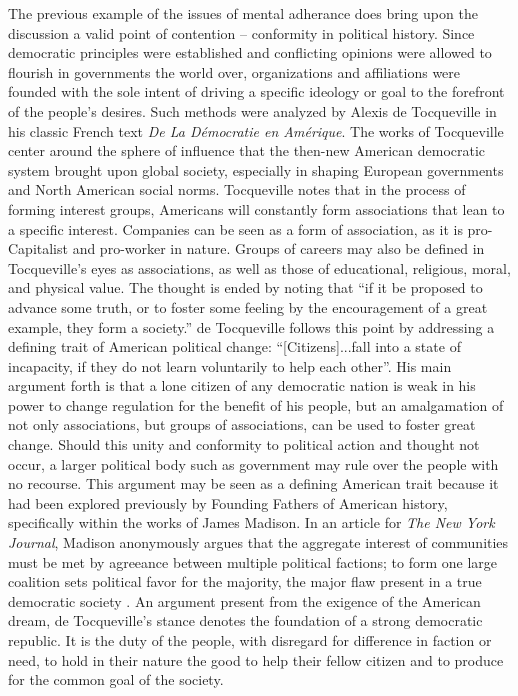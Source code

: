 \documentclass[12pt,letterpaper]{report}
\begin{document}
  \par The previous example of the issues of mental adherance does bring upon the discussion a valid point of contention -- conformity in political history. Since democratic principles were established and conflicting opinions were allowed to flourish in governments the world over, organizations and affiliations were founded with the sole intent of driving a specific ideology or goal to the forefront of the people's desires. Such methods were analyzed by Alexis de Tocqueville in his classic French text \textit{De La D\'{e}mocratie en Am\'{e}rique}. The works of Tocqueville center around the sphere of influence that the then-new American democratic system brought upon global society, especially in shaping European governments and North American social norms. Tocqueville notes that in the process of forming interest groups, Americans will constantly form associations that lean to a specific interest. Companies can be seen as a form of association, as it is pro-Capitalist and pro-worker in nature. Groups of careers may also be defined in Tocqueville's eyes as associations, as well as those of educational, religious, moral, and physical value. The thought is ended by noting that ``if it be proposed to advance some truth, or to foster some feeling by the encouragement of a great example, they form a society.'' \citep{deToc1835} de Tocqueville follows this point by addressing a defining trait of American political change: ``[Citizens]...fall into a state of incapacity, if they do not learn voluntarily to help each other''. His main argument forth is that a lone citizen of any democratic nation is weak in his power to change regulation for the benefit of his people, but an amalgamation of not only associations, but groups of associations, can be used to foster great change. Should this unity and conformity to political action and thought not occur, a larger political body such as government may rule over the people with no recourse. This argument may be seen as a defining American trait because it had been explored previously by Founding Fathers of American history, specifically within the works of James Madison. In an article for \textit{The New York Journal}, Madison anonymously argues that the aggregate interest of communities must be met by agreeance between multiple political factions; to form one large coalition sets political favor for the majority, the major flaw present in a true democratic society \citep{Madison1787}. An argument present from the exigence of the American dream, de Tocqueville's stance denotes the foundation of a strong democratic republic. It is the duty of the people, with disregard for difference in faction or need, to hold in their nature the good to help their fellow citizen and to produce for the common goal of the society.
\end{document}
